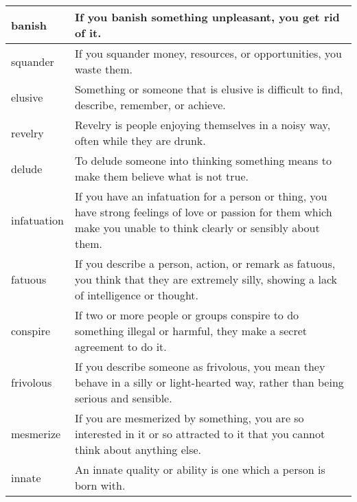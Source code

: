 \documentclass{article}
\begin{document}
\begin{center}
\begin{longtable}{|l|p{7cm}|}
\hline
banish
&
If you banish something unpleasant, you get rid of it.
\\

\hline
squander
&
If you squander money, resources, or opportunities, you waste them.
\\

\hline
elusive
&
Something or someone that is elusive is difficult to find, describe, remember, or achieve.
\\

\hline
revelry
&
Revelry is people enjoying themselves in a noisy way, often while they are drunk.
\\

\hline
delude
&
To delude someone into thinking something means to make them believe what is not true.
\\

\hline
infatuation
&
If you have an infatuation for a person or thing, you have strong feelings of love or passion for them which make you unable to think clearly or sensibly about them.
\\

\hline
fatuous
&
If you describe a person, action, or remark as fatuous, you think that they are extremely silly, showing a lack of intelligence or thought.
\\

\hline
conspire
&
If two or more people or groups conspire to do something illegal or harmful, they make a secret agreement to do it.
\\

\hline
frivolous
&
If you describe someone as frivolous, you mean they behave in a silly or light-hearted way, rather than being serious and sensible.
\\

\hline
mesmerize
&
If you are mesmerized by something, you are so interested in it or so attracted to it that you cannot think about anything else.
\\

\hline
innate
&
An innate quality or ability is one which a person is born with.
\\

\hline

\end{longtable}
\end{center}
\end{document}
